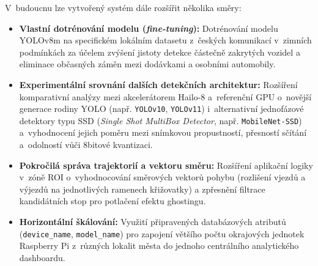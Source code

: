 V~budoucnu lze vytvořený systém dále rozšířit několika směry:
\begin{itemize}
    \item \textbf{Vlastní dotrénování modelu (\textit{fine-tuning}):} Dotrénování modelu YOLOv8m na specifickém lokálním datasetu z~českých komunikací v~zimních podmínkách za účelem zvýšení jistoty detekce částečně zakrytých vozidel a eliminace občasných záměn mezi dodávkami a osobními automobily.
    \item \textbf{Experimentální srovnání dalších detekčních architektur:} Rozšíření komparativní analýzy mezi akcelerátorem Hailo-8 a~referenční GPU o~novější generace rodiny YOLO (např. \texttt{YOLOv10}, \texttt{YOLOv11}) i~alternativní jednofázové detektory typu \acs{SSD} (\textit{Single Shot MultiBox Detector}, např. \texttt{MobileNet-SSD}) a~vyhodnocení jejich poměru mezi snímkovou propustností, přesností sčítání a~odolností vůči 8bitové kvantizaci.
    \item \textbf{Pokročilá správa trajektorií a vektoru směru:} Rozšíření aplikační logiky v~zóně ROI o~vyhodnocování směrových vektorů pohybu (rozlišení vjezdů a výjezdů na jednotlivých ramenech křižovatky) a zpřesnění filtrace kandidátních stop pro potlačení efektu ghostingu.
    \item \textbf{Horizontální škálování:} Využití připravených databázových atributů (\texttt{device\_name}, \texttt{model\_name}) pro zapojení většího počtu okrajových jednotek Raspberry Pi z~různých lokalit města do jednoho centrálního analytického dashboardu.
\end{itemize}
